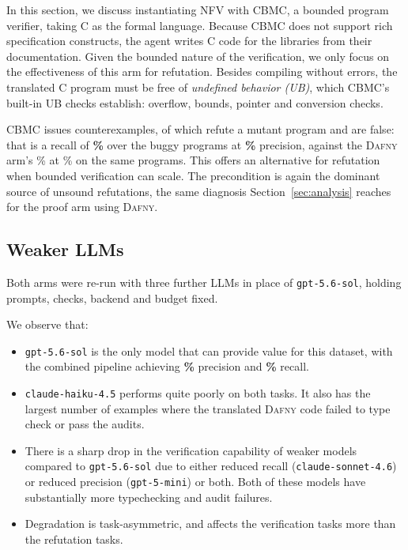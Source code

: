 \documentclass[11pt,letterpaper]{article}
\newcommand{\daf}{\textsc{Dafny}}
\newcommand{\cbmc}{\textsc{CBMC}}
\begin{document}
In this section, we discuss instantiating NFV with \cbmc{}, a bounded program verifier, 
taking C as the formal language. 
Because \cbmc{} does not support rich specification constructs, the agent writes 
C code for the libraries from their documentation. 
Given the bounded nature of the verification, we only focus on the effectiveness of 
this arm for refutation. 
Besides compiling without errors, the translated C program must be free of
\emph{undefined behavior (UB)}, which \cbmc{}'s built-in UB checks establish:
overflow, bounds, pointer and conversion checks.

\cbmc{} issues \cbmccexclaims{} counterexamples, of which \cbmccexgood{} refute a
mutant program and \cbmcfpall{} are false: that is a recall of
\textbf{\cbmccexrec{}\%} over the \dspairs{} buggy programs at
\textbf{\cbmccexprec{}\%} precision, against the \daf{} arm's
\anrefuterawrec{}\% at \anrefuterawprec{}\% on the same programs. 
This offers an alternative for refutation when bounded verification can scale. 
The precondition is again the dominant
source of unsound refutations, the same diagnosis Section~\ref{sec:analysis}
reaches for the proof arm using \daf{}. 

\subsection{Weaker LLMs}
\label{sec:weakmodel}

Both arms were re-run with three further LLMs in place of
\texttt{gpt-5.6-sol}, holding prompts, checks, backend and budget fixed.



We observe that:
\begin{itemize}
  \item \texttt{gpt-5.6-sol} is the only model that can provide value for this
  dataset, with the combined pipeline achieving \textbf{\anpipeprec{}\%}
  precision and \textbf{\anpiperec{}\%} recall.
  \item \texttt{claude-haiku-4.5} performs quite poorly on both tasks.
  It also has the largest number of examples where the translated \daf{} code failed to type check or pass the audits.
  \item There is a sharp drop in the verification capability of weaker models compared to \texttt{gpt-5.6-sol} 
due to either reduced recall (\texttt{claude-sonnet-4.6}) or reduced precision (\texttt{gpt-5-mini}) or both.
Both of these models have substantially more typechecking and audit failures.
  \item Degradation is task-asymmetric, and affects the verification tasks more than the refutation tasks.

\end{itemize}
\end{document}
